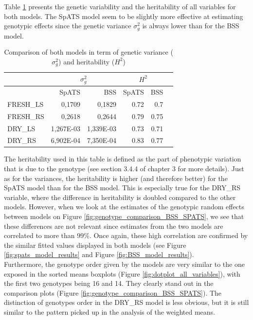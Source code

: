 Table \ref{tab:geno_var_heritability} presents the genetic variability and the heritability of all variables for both models. The SpATS model seem to be slightly more effective at estimating genotypic effects since the genetic variance $\sigma^2_{g}$ is always lower than for the BSS model.\\

\begin{table}[htbp]
  \centering
  \caption[Comparison of both models in term of genetic variance and heritability]{Comparison of both models in term of genetic variance ($\sigma_{g}^2$) and heritability ($H^2$) }
    \begin{tabular}{lrrrrr}
 \toprule 
  & \multicolumn{2}{c}{$\sigma_{g}^2$} & \multicolumn{2}{c}{$H^2$} \\ 
  \midrule
  & SpATS & BSS & SpATS & BSS \\
  \midrule
 \hline 
 FRESH\_LS & 0,1709 & 0,1829 & 0.72 & 0.7 \\
 FRESH\_RS & 0,2618 & 0,2644 & 0.79 & 0.75 \\ 
 DRY\_LS & 1,267E-03 & 1,339E-03 & 0.73 & 0.71 \\ 
 DRY\_RS & 6,902E-04 & 7,350E-04 & 0.83 & 0.77 \\  
 \bottomrule 
    \end{tabular}%
\label{tab:geno_var_heritability}
\end{table}%
 
The heritability used in this table is defined as the part of phenotypic variation that is due to the genotype (see section 3.4.4 of chapter 3 for more details). Just as for the variances, the heritability is higher (and therefore better) for the SpATS model than for the BSS model. This is especially true for the DRY\_RS variable, where the difference in heritability is doubled compared to the other models. However, when we look at the estimates of the genotypic random effects between models on Figure \ref{fig:genotype_comparison_BSS_SPATS}, we see that these differences are not relevant since estimates from the two models are correlated to more than 99\%. Once again, these high correlation are confirmed by the similar fitted values displayed in both models (see Figure \ref{fig:spats_model_results} and Figure \ref{fig:BSS_model_results}).\\

Furthermore, the genotype order given by the models are very similar to the one exposed in the sorted means boxplots (Figure \ref{fig:dotplot_all_variables}), with the first two genotypes being 16 and 14. They clearly stand out in the comparison plots (Figure \ref{fig:genotype_comparison_BSS_SPATS}). The distinction of genotypes order in the DRY\_RS model is less obvious, but it is still similar to the pattern picked up in the analysis of the weighted means.\\
 
